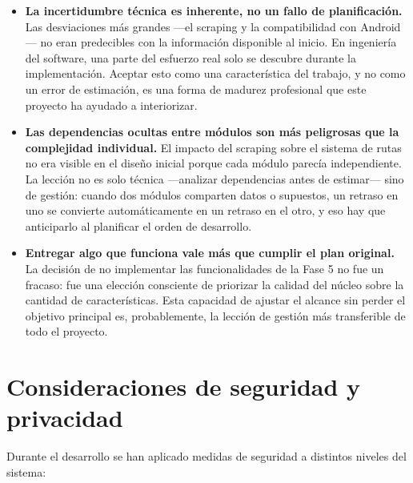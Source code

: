 \begin{itemize}
    \item \textbf{La incertidumbre técnica es inherente, no un fallo de planificación.} Las desviaciones más grandes ---el scraping y la compatibilidad con Android--- no eran predecibles con la información disponible al inicio. En ingeniería del software, una parte del esfuerzo real solo se descubre durante la implementación. Aceptar esto como una característica del trabajo, y no como un error de estimación, es una forma de madurez profesional que este proyecto ha ayudado a interiorizar.

    \item \textbf{Las dependencias ocultas entre módulos son más peligrosas que la complejidad individual.} El impacto del scraping sobre el sistema de rutas no era visible en el diseño inicial porque cada módulo parecía independiente. La lección no es solo técnica ---analizar dependencias antes de estimar--- sino de gestión: cuando dos módulos comparten datos o supuestos, un retraso en uno se convierte automáticamente en un retraso en el otro, y eso hay que anticiparlo al planificar el orden de desarrollo.

    \item \textbf{Entregar algo que funciona vale más que cumplir el plan original.} La decisión de no implementar las funcionalidades de la Fase 5 no fue un fracaso: fue una elección consciente de priorizar la calidad del núcleo sobre la cantidad de características. Esta capacidad de ajustar el alcance sin perder el objetivo principal es, probablemente, la lección de gestión más transferible de todo el proyecto.
\end{itemize}

\section{Consideraciones de seguridad y privacidad}

Durante el desarrollo se han aplicado medidas de seguridad a distintos niveles del sistema:

